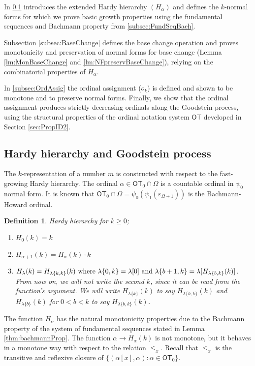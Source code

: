 \documentclass{amsart}
\theoremstyle{plain}
\theoremstyle{plain}
\newtheorem*{definition}{Definition}
\newcommand\OT{\mathsf{OT}}
\newcommand{\Om}{{\Omega}}
\newcommand{\ok}{o_{k}}
\newcommand{\al}{{\alpha}}
\begin{document}
In \ref{subsec:HardyGoodstein} introduces the extended Hardy hierarchy $(H_\alpha)$ and defines the $k$-normal forms for which we prove basic growth properties using the fundamental sequences and Bachmann property from \ref{subsec:FundSeqBach}.

Subsection \ref{subsec:BaseChange} defines the base change operation and proves monotonicity and preservation of normal forms for base change (Lemma \ref{lm:MonBaseChange} and \ref{lm:NFpreservBaseChange}), relying on the combinatorial properties of $H_\alpha$.

In \ref{subsec:OrdAssig} the ordinal assignment ($\ok$) is defined and shown to be monotone and to preserve normal forms.
Finally, we show that the ordinal assignment produces strictly decreasing ordinals along the Goodstein process, using the structural properties of the ordinal notation system $\OT$ developed in Section \ref{sec:PropID2}.


\subsection{Hardy hierarchy and Goodstein process}\label{subsec:HardyGoodstein}
The $k$-representation of a number $m$ is constructed with respect to the fast-growing Hardy hierarchy. The ordinal $\al \in \OT_0 \cap \Om$ is a countable ordinal in $\psi_0$ normal form. It is known that $\OT_0 \cap \Om= \psi_0(\psi_1(\varepsilon_{\Om+1}))$ is the Bachmann-Howard ordinal. 
\begin{definition} Hardy hierarchy for $k\geq 0$;
\begin{enumerate}[label=(\roman*)]
    \item $H_0(k) = k$
    \item $H_{\al+1}(k) =H_{\al}(k) \cdot k$
    \item $ H_\lambda(k) =   H_{\lambda{\{k,k\}}} (k) \text{ where } \\
    \lambda{\{0,k\}} = \lambda[0] \text{ and } \lambda{\{b+1,k\}} = \lambda[H_{\lambda\{b,k\}} (k)] $.\medskip
    \\
    From now on, we will not write the second $k$, since it can be read from the function's argument. We will write $H_{\lambda{\{k\}}} (k)$ to say $ H_{\lambda{\{k,k\}}} (k)$ and $H_{\lambda{\{b\}}} (k)$ for $0<b<k$ to say $H_{\lambda{\{b,k\}}} (k)$. \medskip
\end{enumerate}
\end{definition}
The function $H_\al$ has the natural monotonicity properties due to the Bachmann property of the system of fundamental sequences stated in Lemma \ref{thm:bachmannProp}. The function $\al \rightarrow H_\al(k)$ is not monotone, but it behaves in a monotone way with respect to the relation $\leq_{x}$.
Recall that $\leq_{x}$ is the transitive and reflexive closure of $\{ (\al[x],\al ) : \al \in \OT_0\}$.
\end{document}
